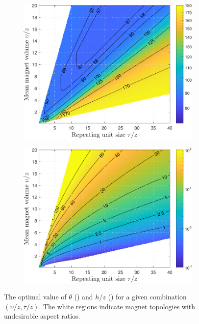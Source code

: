 \begin{figure}
	\centering
	\begin{subfigure}{0.8\textwidth}
		\centering
		\includegraphics[width=\linewidth]{p3/p3FIG14a}
		\subcaption{}
		\label{subfig:p3opttheta}
	\end{subfigure}
	
	\begin{subfigure}{0.8\textwidth}
		\centering
		\includegraphics[width=\linewidth]{p3/p3FIG14b}
		\subcaption{}
		\label{subfig:p3opth}
	\end{subfigure}
	\caption{The optimal value of \(\theta\) () and \(h/z\) () for a given combination \(\left( \upsilon/z, \tau/z \right)\). The white regions indicate magnet topologies with undesirable aspect ratios.}
	\label{fig:p3optvalues}
\end{figure}
